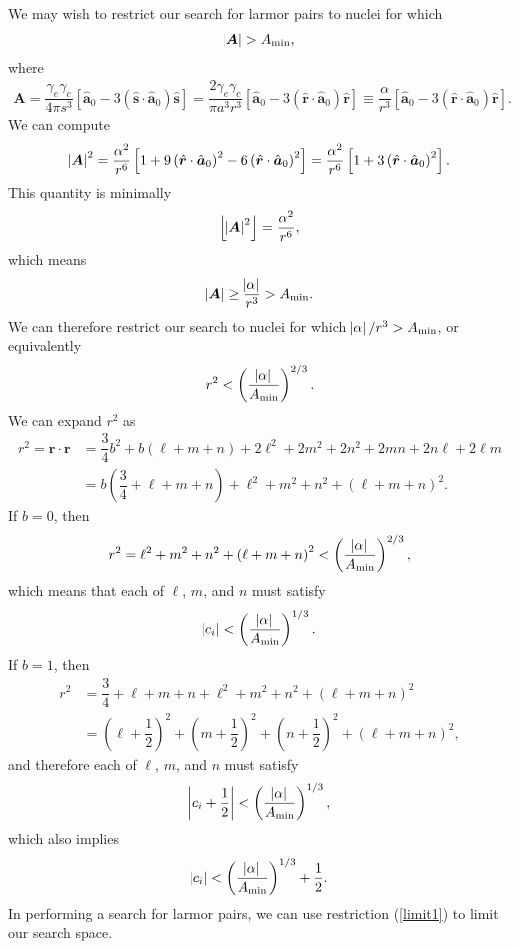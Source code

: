 \documentclass[11pt]{article}
\renewcommand{\t}{\text} %
\newcommand{\f}[2]{\dfrac{#1}{#2}} %
\newcommand{\p}[1]{\left(#1\right)} %
\renewcommand{\sp}[1]{\left[#1\right]} %
\renewcommand{\v}{\bm} %
\newcommand{\uv}[1]{\hat{\v{#1}}} %
\renewcommand{\c}{\cdot} %
\renewcommand{\l}{\ell} %
\newcommand{\floor}[1]{\left\lfloor{#1}\right\rfloor}
\begin{document}
We may wish to restrict our search for larmor pairs to nuclei for
which
\begin{align}
  \abs{\v A}>A_{\t{min}}, \label{condC0}
\end{align}
where
\begin{align}
  \v A=\f{\gamma_e\gamma_c}{4\pi s^3}\sp{\uv a_0-3\p{\uv s\c\uv
      a_0}\uv s} =\f{2\gamma_e\gamma_c}{\pi a^3r^3}\sp{\uv a_0-3\p{\uv
      r\c\uv a_0}\uv r}\equiv \f{\alpha}{r^3}\sp{\uv a_0-3\p{\uv
      r\c\uv a_0}\uv r}.
\end{align}
We can compute
\begin{align}
  \abs{\v A}^2=\f{\alpha^2}{r^6}\sp{1+9\p{\uv r\c\uv a_0}^2-6\p{\uv
      r\c\uv a_0}^2}=\f{\alpha^2}{r^6}\sp{1+3\p{\uv r\c\uv a_0}^2}.
\end{align}
This quantity is minimally
\begin{align}
  \floor{\abs{\v A}^2}=\f{\alpha^2}{r^6},
\end{align}
which means
\begin{align}
  \abs{\v A} \ge \f{\abs{\alpha}}{r^3} > A_{\t{min}}.
\end{align}
We can therefore restrict our search to nuclei for which
$\abs{\alpha}/r^3>A_{\t{min}}$, or equivalently
\begin{align}
  r^2<\p{\f{\abs{\alpha}}{A_{\t{min}}}}^{2/3}. \label{condC1}
\end{align}
We can expand $r^2$ as
\begin{align}
  r^2=\v r\c\v r
  &=\f34b^2+b\p{\l+m+n}+2\l^2+2m^2+2n^2+2mn+2n\l+2\l m \\
  &=b\p{\f34+\l+m+n}+\l^2+m^2+n^2+\p{\l+m+n}^2.
\end{align}
If $b=0$, then
\begin{align}
  r^2=\l^2+m^2+n^2+\p{\l+m+n}^2<\p{\f{\abs{\alpha}}{A_{\t{min}}}}^{2/3},
\end{align}
which means that each of $\l$, $m$, and $n$ must satisfy
\begin{align}
  \abs{c_i}<\p{\f{\abs{\alpha}}{A_{\t{min}}}}^{1/3}. \label{limit0}
\end{align}
If $b=1$, then
\begin{align}
  r^2&=\f34+\l+m+n+\l^2+m^2+n^2+\p{\l+m+n}^2 \\
  &=\p{\l+\f12}^2+\p{m+\f12}^2+\p{n+\f12}^2+\p{\l+m+n}^2,
\end{align}
and therefore each of $\l$, $m$, and $n$ must satisfy
\begin{align}
  \abs{c_i+\f12}<\p{\f{\abs{\alpha}}{A_{\t{min}}}}^{1/3},
\end{align}
which also implies
\begin{align}
  \abs{c_i}<\p{\f{\abs{\alpha}}{A_{\t{min}}}}^{1/3}+\f12.
  \label{limit1}
\end{align}
In performing a search for larmor pairs, we can use restriction
(\ref{limit1}) to limit our search space.
\end{document}
